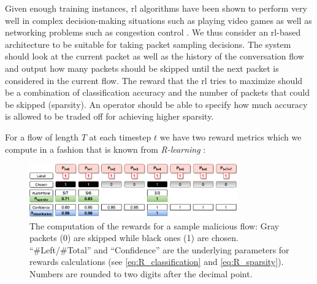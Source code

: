 \documentclass[conference]{IEEEtran}
\begin{document}
Given enough training instances, \gls{rl} algorithms have been shown to perform very well in complex decision-making situations such as playing video games \cite{mnih_playing_2013} as well as networking problems such as congestion control \cite{bachl_rax_2019}. We thus consider an \gls{rl}-based architecture to be suitable for taking packet sampling decisions. The system should look at the current packet as well as the history of the conversation flow and output how many packets should be skipped until the next packet is considered in the current flow. The reward that the \gls{rl} tries to maximize should be a combination of classification accuracy and the number of packets that could be skipped (sparsity). An operator should be able to specify how much accuracy is allowed to be traded off for achieving higher sparsity.%


For a flow of length $T$ at each timestep $t$ we have two reward metrics which we compute in a fashion that is known from \textit{R-learning} \cite{schwartz_reinforcement_1993}:


\begin{figure}
\centering
  \includegraphics[width=0.8\textwidth]{img/rewards_calc_example.pdf}
  \caption{The computation of the rewards for a sample malicious flow: Gray packets (0) are skipped while black ones (1) are chosen. ``\#Left\//\#Total'' and ``Confidence'' are the underlying parameters for rewards calculations (see \autoref{eq:R_classification} and \autoref{eq:R_sparsity}). Numbers are rounded to two digits after the decimal point.}
  \label{fig:rewards}
\end{figure}
\end{document}
